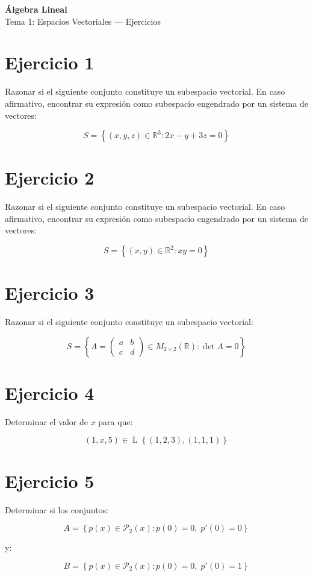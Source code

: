 \documentclass[11pt,a4paper]{article}
\newcommand{\R}{\mathbb{R}}
\newcommand{\Pn}{\mathcal{P}}
\newcommand{\Span}{\operatorname{L}}
\begin{document}
\begin{center}
	{\LARGE\bfseries Álgebra Lineal}\\[0.4em]
	{\Large Tema 1: Espacios Vectoriales --- Ejercicios}
\end{center}

\section{Ejercicio 1}
Razonar si el siguiente conjunto constituye un subespacio vectorial. En caso afirmativo, encontrar su expresión como subespacio engendrado por un sistema de vectores:

\[
S=
\left\{
(x,y,z)\in\R^3:
2x-y+3z=0
\right\}
\]

\section{Ejercicio 2}
Razonar si el siguiente conjunto constituye un subespacio vectorial. En caso afirmativo, encontrar su expresión como subespacio engendrado por un sistema de vectores:

\[
S=
\left\{
(x,y)\in\R^2:
xy=0
\right\}
\]

\section{Ejercicio 3}
Razonar si el siguiente conjunto constituye un subespacio vectorial:

\[
S=
\left\{
A=
\begin{pmatrix}
a&b\\
c&d
\end{pmatrix}
\in M_{2\times2}(\R):
\det A=0
\right\}
\]

\section{Ejercicio 4}
Determinar el valor de $x$ para que:

\[
(1,x,5)\in
\Span\left\{
(1,2,3),(1,1,1)
\right\}
\]

\section{Ejercicio 5}
Determinar si los conjuntos:

\[
A=
\left\{
p(x)\in\Pn_2(x):
p(0)=0,\;
p'(0)=0
\right\}
\]

y:

\[
B=
\left\{
p(x)\in\Pn_2(x):
p(0)=0,\;
p'(0)=1
\right\}
\]
\end{document}
